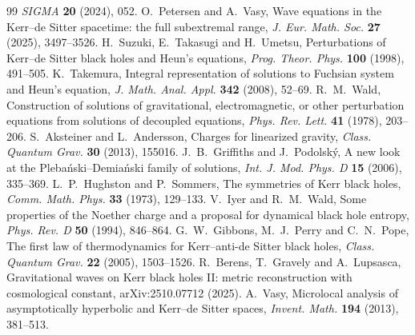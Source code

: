 \documentclass[11pt]{amsart}
\theoremstyle{definition}
\theoremstyle{remark}
\numberwithin{equation}{section}
\begin{document}
\begin{thebibliography}{99}
\emph{SIGMA} \textbf{20} (2024), 052.
 O.~Petersen and A.~Vasy, Wave equations in the Kerr--de Sitter spacetime: the full subextremal range,
\emph{J. Eur. Math. Soc.} \textbf{27} (2025), 3497--3526.
 H.~Suzuki, E.~Takasugi and H.~Umetsu, Perturbations of Kerr--de Sitter black holes and Heun's
equations, \emph{Prog. Theor. Phys.} \textbf{100} (1998), 491--505.
 K.~Takemura, Integral representation of solutions to Fuchsian system and Heun's equation,
\emph{J. Math. Anal. Appl.} \textbf{342} (2008), 52--69.
 R.~M.~Wald, Construction of solutions of gravitational, electromagnetic, or other perturbation
equations from solutions of decoupled equations, \emph{Phys. Rev. Lett.} \textbf{41} (1978), 203--206.
 S.~Aksteiner and L.~Andersson, Charges for linearized gravity, \emph{Class. Quantum Grav.} \textbf{30}
(2013), 155016.
 J.~B.~Griffiths and J.~Podolsk\'y, A new look at the Pleba\'nski--Demia\'nski family of solutions,
\emph{Int. J. Mod. Phys. D} \textbf{15} (2006), 335--369.
 L.~P.~Hughston and P.~Sommers, The symmetries of Kerr black holes, \emph{Comm. Math. Phys.} \textbf{33}
(1973), 129--133.
 V.~Iyer and R.~M.~Wald, Some properties of the Noether charge and a proposal for dynamical black hole
entropy, \emph{Phys. Rev. D} \textbf{50} (1994), 846--864.
 G.~W.~Gibbons, M.~J.~Perry and C.~N.~Pope, The first law of thermodynamics for Kerr--anti-de Sitter black
holes, \emph{Class. Quantum Grav.} \textbf{22} (2005), 1503--1526.
 R.~Berens, T.~Gravely and A.~Lupsasca, Gravitational waves on Kerr black holes II: metric
reconstruction with cosmological constant, arXiv:2510.07712 (2025).
 A.~Vasy, Microlocal analysis of asymptotically hyperbolic and Kerr--de Sitter spaces, \emph{Invent.
Math.} \textbf{194} (2013), 381--513.
\end{thebibliography}
\end{document}
